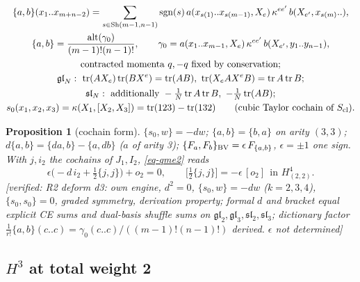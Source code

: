 \documentclass[10pt,a4paper]{article}
\numberwithin{equation}{section}
\newtheorem{proposition}[theorem]{Proposition}
\theoremstyle{definition}
\theoremstyle{remark}
\newcommand{\tr}{\operatorname{tr}}
\newcommand{\alt}{\operatorname{alt}}
\newcommand{\sgn}{\operatorname{sgn}}
\newcommand{\fsl}{\mathfrak{sl}}
\newcommand{\fgl}{\mathfrak{gl}}
\newcommand{\ver}[1]{\textup{[verified: #1]}}
\begin{document}
\begin{gather}
\{a,b\}(x_1..x_{m+n-2})=\sum_{s\in{\rm Sh}(m-1,n-1)}\sgn(s)\,a(x_{s(1)}..x_{s(m-1)},X_e)\,\kappa^{ee'}\,b(X_{e'},x_{s(m)}..),\\
\{a,b\}=\frac{\alt(\gamma_0)}{(m-1)!(n-1)!},\qquad
\gamma_0=a(x_1..x_{m-1},X_e)\,\kappa^{ee'}\,b(X_{e'},y_1..y_{n-1}),\\
\text{contracted momenta }q,-q\text{ fixed by conservation};\\
\fgl_N:\ \tr(AX_e)\tr(BX^e)=\tr(AB),\ \tr(X_eAX^eB)=\tr A\tr B;\\
\fsl_N:\ \text{additionally }-\tfrac1N\tr A\tr B,\ -\tfrac1N\tr(AB);\\
s_0(x_1,x_2,x_3)=\kappa(X_1,[X_2,X_3])=\tr(123)-\tr(132)\qquad(\text{cubic Taylor cochain of }S_{\rm cl}).
\end{gather}

\begin{proposition}[cochain form]\label{prop-cochain}
$\{s_0,w\}=-dw$; $\{a,b\}=\{b,a\}$ on arity $(3,3)$; $d\{a,b\}=\{da,b\}-\{a,db\}$ ($a$ of arity 3); $\{F_a,F_b\}_{\rm BV}=\epsilon\,F_{\{a,b\}}$, $\epsilon=\pm1$ one sign. With $j,i_2$ the cochains of $J_1,I_2$, \eqref{eq-qme2} reads
\begin{equation}
\epsilon\big(-d\,i_2+\tfrac12\{j,j\}\big)+o_2=0,\qquad \big[\tfrac12\{j,j\}\big]=-\epsilon\,[o_2]\ \ \text{in }H^4_{(2,2)} .\label{eq-cochain}
\end{equation}
\ver{R2 deform d3: own engine, $d^2=0$, $\{s_0,w\}=-dw$ ($k=2,3,4$), $\{s_0,s_0\}=0$, graded symmetry, derivation property; formal $d$ and bracket equal explicit CE sums and dual-basis shuffle sums on $\fgl_2,\fgl_3,\fsl_2,\fsl_3$; dictionary factor $\frac1{r!}\{a,b\}(c..c)=\gamma_0(c..c)/((m-1)!(n-1)!)$ derived. $\epsilon$ not determined}
\end{proposition}

\subsection{\texorpdfstring{$H^3$ at total weight 2}{H3 at total weight 2}}
\end{document}
